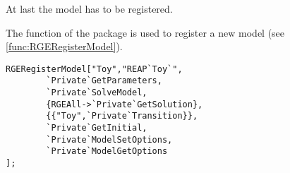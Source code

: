 At last the model has to be registered.

The function  of the package  is used to register a new
model (see \ref{func:RGERegisterModel}).

\begin{verbatim}
RGERegisterModel["Toy","REAP`Toy`",
        `Private`GetParameters,
        `Private`SolveModel,
        {RGEAll->`Private`GetSolution},
        {{"Toy",`Private`Transition}},
        `Private`GetInitial,
        `Private`ModelSetOptions,
        `Private`ModelGetOptions
];
\end{verbatim}

